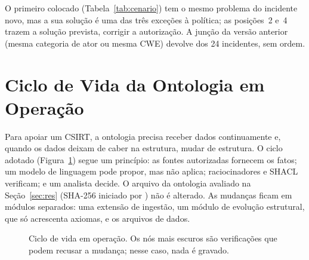 \documentclass[12pt]{article}
\begin{document}
O primeiro colocado (Tabela~\ref{tab:cenario}) tem o mesmo problema do incidente novo, mas a sua solução é uma das três exceções à política; as posições~2 e~4 trazem a solução prevista, corrigir a autorização. A junção da versão anterior (mesma categoria de ator ou mesma CWE) devolve \scenVsixN{} dos 24 incidentes, sem ordem.

\section{Ciclo de Vida da Ontologia em Operação}
\label{sec:ciclo}

Para apoiar um CSIRT, a ontologia precisa receber dados continuamente e, quando os dados deixam de caber na estrutura, mudar de estrutura. O ciclo adotado (Figura~\ref{fig:ciclo}) segue um princípio: as fontes autorizadas fornecem os fatos; um modelo de linguagem pode propor, mas não aplica; raciocinadores e SHACL verificam; e um analista decide. O arquivo da ontologia avaliado na Seção~\ref{sec:res} (SHA-256 iniciado por \texttt{\vSevenHash}) não é alterado. As mudanças ficam em módulos separados: uma extensão de ingestão, um módulo de evolução estrutural, que só acrescenta axiomas, e os arquivos de dados.

\begin{figure}[ht]
\centering
{}
\caption{Ciclo de vida em operação. Os nós mais escuros são verificações que podem recusar a mudança; nesse caso, nada é gravado.}
\label{fig:ciclo}
\end{figure}
\end{document}
